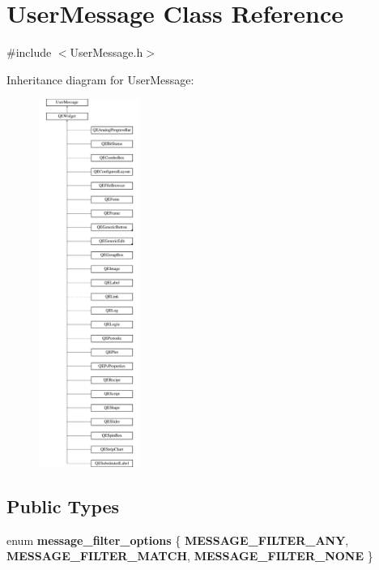 \hypertarget{classUserMessage}{
\section{UserMessage Class Reference}
\label{classUserMessage}
}


{\ttfamily \#include $<$UserMessage.h$>$}

Inheritance diagram for UserMessage:\begin{figure}[H]
\begin{center}
\leavevmode
\includegraphics[height=12.000000cm]{classUserMessage}
\end{center}
\end{figure}
\subsection*{Public Types}
\begin{DoxyCompactItemize}
\item 
enum {\bfseries message\_\-filter\_\-options} \{ {\bfseries MESSAGE\_\-FILTER\_\-ANY}, 
{\bfseries MESSAGE\_\-FILTER\_\-MATCH}, 
{\bfseries MESSAGE\_\-FILTER\_\-NONE}
 \}
\end{DoxyCompactItemize}
